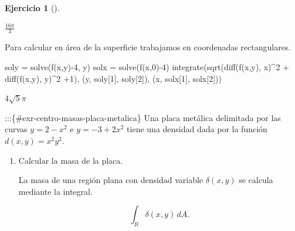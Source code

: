 \documentclass[
  a4paper,
]{scrreport}
\newenvironment{Shaded}{\begin{snugshade}}{\end{snugshade}}
\newcommand{\FloatTok}[1]{\textcolor[rgb]{0.68,0.00,0.00}{#1}}
\newcommand{\FunctionTok}[1]{\textcolor[rgb]{0.28,0.35,0.67}{#1}}
\newcommand{\NormalTok}[1]{\textcolor[rgb]{0.00,0.23,0.31}{#1}}
\newcommand{\OperatorTok}[1]{\textcolor[rgb]{0.37,0.37,0.37}{#1}}
\theoremstyle{definition}
\newtheorem{exercise}{Ejercicio}[chapter]
\theoremstyle{remark}
\begin{document}
\begin{exercise}[]
\begin{tcolorbox}
$\frac{16 \pi}{3}$

Para calcular en área de la superficie trabajamos en coordenadas
rectangulares.

\begin{Shaded}
\begin{Highlighting}[]
\NormalTok{soly }\OperatorTok{=} \FunctionTok{solve}\NormalTok{(}\FunctionTok{f}\NormalTok{(x,y)}\OperatorTok{{-}}\FloatTok{4}\NormalTok{, y)}
\NormalTok{solx }\OperatorTok{=} \FunctionTok{solve}\NormalTok{(}\FunctionTok{f}\NormalTok{(x,}\FloatTok{0}\NormalTok{)}\OperatorTok{{-}}\FloatTok{4}\NormalTok{)}
\FunctionTok{integrate}\NormalTok{(}\FunctionTok{sqrt}\NormalTok{(}\FunctionTok{diff}\NormalTok{(}\FunctionTok{f}\NormalTok{(x,y), x)}\OperatorTok{\^{}}\FloatTok{2} \OperatorTok{+} \FunctionTok{diff}\NormalTok{(}\FunctionTok{f}\NormalTok{(x,y), y)}\OperatorTok{\^{}}\FloatTok{2} \OperatorTok{+}\FloatTok{1}\NormalTok{), (y, soly[}\FloatTok{1}\NormalTok{], soly[}\FloatTok{2}\NormalTok{]), (x, solx[}\FloatTok{1}\NormalTok{], solx[}\FloatTok{2}\NormalTok{]))}
\end{Highlighting}
\end{Shaded}

$4 \sqrt{5} \pi$

\end{tcolorbox}

\end{exercise}

:::\{\#exr-centro-masas-placa-metalica\} Una placa metálica delimitada
por las curvas \(y=2-x^2\) e \(y=-3+2x^2\) tiene una densidad dada por
la función \(d(x,y)=x^2y^2\).

\begin{enumerate}
\def\labelenumi{\alph{enumi}.}
\item
  Calcular la masa de la placa.

  \begin{tcolorbox}[enhanced jigsaw, colback=white, leftrule=.75mm, rightrule=.15mm, left=2mm, colframe=quarto-callout-note-color-frame, bottomrule=.15mm, breakable, colbacktitle=quarto-callout-note-color!10!white, title=\textcolor{quarto-callout-note-color}{\faInfo}\hspace{0.5em}{Ayuda}, bottomtitle=1mm, arc=.35mm, titlerule=0mm, toptitle=1mm, toprule=.15mm, opacityback=0, opacitybacktitle=0.6, coltitle=black]

  La masa de una región plana con densidad variable \(\delta(x,y)\) se
  calcula mediante la integral.

  \[
  \int_R \delta(x,y)\,dA.
  \]

  \end{tcolorbox}
\end{enumerate}
\end{document}
